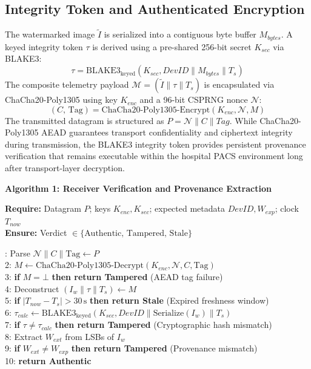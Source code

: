 \documentclass[runningheads]{llncs}
\begin{document}
\subsection{Integrity Token and Authenticated Encryption}
The watermarked image $\tilde{I}$ is serialized into a contiguous byte buffer $M_{bytes}$. A keyed integrity token $\tau$ is derived using a pre-shared 256-bit secret $K_{sec}$ via BLAKE3:
\begin{equation}
  \tau = \text{BLAKE3}_{\text{keyed}}(K_{sec}, DevID \parallel M_{bytes} \parallel T_s)
\end{equation}
The composite telemetry payload $\mathcal{M} = (\tilde{I} \parallel \tau \parallel T_s)$ is encapsulated via ChaCha20-Poly1305 using key $K_{enc}$ and a 96-bit CSPRNG nonce $\mathcal{N}$:
\begin{equation}
  (C,\,\text{Tag}) = \text{ChaCha20-Poly1305-Encrypt}(K_{enc},\mathcal{N},M)
\end{equation}
The transmitted datagram is structured as $P = \mathcal{N} \parallel C \parallel Tag$. While ChaCha20-Poly1305 AEAD guarantees transport confidentiality and ciphertext integrity during transmission, the BLAKE3 integrity token provides persistent provenance verification that remains executable within the hospital PACS environment long after transport-layer decryption.


\vspace{10pt}
\noindent\textbf{Algorithm 1: Receiver Verification and Provenance Extraction}

\noindent\textbf{Require:} Datagram $P$; keys $K_{enc}, K_{sec}$; expected metadata $DevID, W_{exp}$; clock $T_{now}$\\
\textbf{Ensure:} Verdict $\in \{\text{Authentic},\,\text{Tampered},\,\text{Stale}\}$

: Parse $\mathcal{N} \parallel C \parallel \text{Tag} \gets P$\\
2: $M \gets \text{ChaCha20-Poly1305-Decrypt}(K_{enc}, \mathcal{N}, C, \text{Tag})$\\
3: \textbf{if} $M = \bot$ \textbf{then return Tampered} (AEAD tag failure)\\
4: Deconstruct $(I_w \parallel \tau \parallel T_s) \gets M$\\
5: \textbf{if} $\vert{}T_{now} - T_s\vert{} > 30\,\text{s}$ \textbf{then return Stale} (Expired freshness window)\\
6: $\tau_{\mathit{calc}} \gets \text{BLAKE3}_{\text{keyed}}(K_{sec}, DevID \parallel \text{Serialize}(I_w) \parallel T_s)$\\
7: \textbf{if} $\tau \neq \tau_{\mathit{calc}}$ \textbf{then return Tampered} (Cryptographic hash mismatch)\\
8: Extract $W_{ext}$ from LSBs of $I_w$\\
9: \textbf{if} $W_{ext} \neq W_{exp}$ \textbf{then return Tampered} (Provenance mismatch)\\
10: \textbf{return Authentic}
\vspace{10pt}
\end{document}
